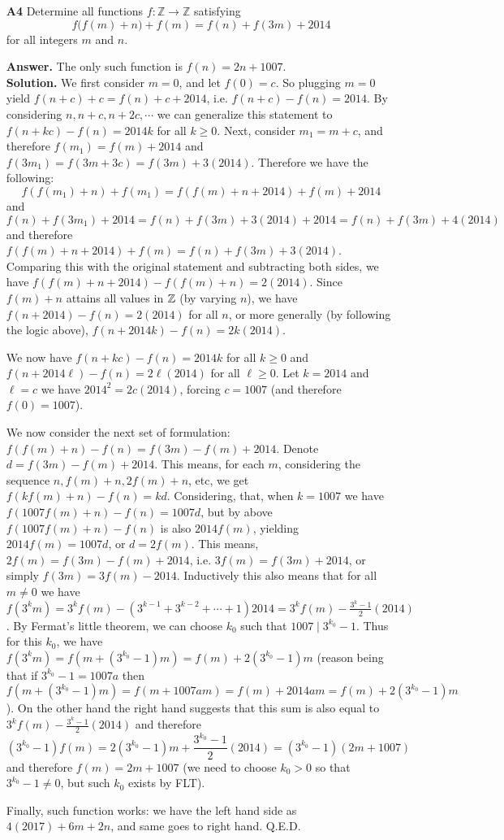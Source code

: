 \documentclass[11pt,a4paper]{article}
\begin{document}
\begin{enumerate}
	\item[\textbf{A4}] Determine all functions $f: \mathbb{Z}\to\mathbb{Z}$ satisfying \[f\big(f(m)+n\big)+f(m)=f(n)+f(3m)+2014\] for all integers $m$ and $n$.
	
	\textbf{Answer.} The only such function is $f(n)=2n+1007$. \\
	\textbf{Solution.} We first consider $m=0$, and let $f(0)=c$. So plugging $m=0$ yield $f(n+c)+c=f(n)+c+2014$, i.e. $f(n+c)-f(n)=2014$. By considering $n, n+c, n+2c, \cdots$ we can generalize this statement to $f(n+kc)-f(n)=2014k$ for all $k\ge 0$. 
	Next, consider $m_1=m+c$, and therefore $f(m_1)=f(m)+2014$ and $f(3m_1)=f(3m+3c)=f(3m)+3(2014)$. 
	Therefore we have the following: 
	\[f(f(m_1)+n)+f(m_1)=f(f(m)+n+2014)+f(m)+2014\]
	and
	\[
	f(n)+f(3m_1)+2014=f(n)+f(3m)+3(2014)+2014=f(n)+f(3m)+4(2014)
	\]
	and therefore $f(f(m)+n+2014)+f(m)=f(n)+f(3m)+3(2014)$. Comparing this with the original statement and subtracting both sides, we have $f(f(m)+n+2014)-f(f(m)+n)=2(2014)$. Since $f(m)+n$ attains all values in $\mathbb{Z}$ (by varying $n$), we have $f(n+2014)-f(n)=2(2014)$ for all $n$, or more generally (by following the logic above), $f(n+2014k)-f(n)=2k(2014)$. 
	
	We now have $f(n+kc)-f(n)=2014k$ for all $k\ge 0$ and $f(n+2014\ell)-f(n)=2\ell(2014)$ for all $\ell\ge 0$. Let $k=2014$ and $\ell=c$ we have $2014^2=2c(2014)$, forcing $c=1007$ (and therefore $f(0)=1007$). 
	
	We now consider the next set of formulation: $f(f(m)+n)-f(n)=f(3m)-f(m)+2014$. Denote $d=f(3m)-f(m)+2014$. 
	This means, for each $m$, considering the sequence $n, f(m)+n, 2f(m)+n$, etc, we get $f(kf(m)+n)-f(n)=kd$. Considering, that, when $k=1007$ we have $f(1007f(m)+n)-f(n)=1007d$, but by above $f(1007f(m)+n)-f(n)$ is also $2014f(m)$, yielding $2014f(m)=1007d$, or $d=2f(m)$. This means, $2f(m)=f(3m)-f(m)+2014$, i.e. $3f(m)=f(3m)+2014$, or simply $f(3m)=3f(m)-2014$. Inductively this also means that for all $m\neq 0$ we have $f(3^km)=3^kf(m)-(3^{k-1}+3^{k-2}+\cdots + 1)2014=3^kf(m)-\frac{3^k-1}{2}(2014)$. By Fermat's little theorem, we can choose $k_0$ such that $1007\mid 3^{k_0}-1$. 
	Thus for this $k_0$, we have $f(3^km)=f(m+(3^{k_0}-1)m)=f(m)+2(3^{k_0}-1)m$ (reason being that if $3^{k_0}-1=1007a$ then $f(m+(3^{k_0}-1)m)=f(m+1007am)=f(m)+2014am=f(m)+2(3^{k_0}-1)m$). 
	On the other hand the right hand suggests that this sum is also equal to $3^kf(m)-\frac{3^k-1}{2}(2014)$ and therefore
	\[(3^{k_0}-1)f(m)=2(3^{k_0}-1)m + \frac{3^{k_0}-1}{2}(2014) = (3^{k_0}-1)(2m + 1007)
	\]
	and therefore $f(m)=2m+1007$ (we need to choose $k_0>0$ so that $3^{k_0}-1\neq 0$, but such $k_0$ exists by FLT). 
	
	Finally, such function works: we have the left hand side as $4(2017)+6m+2n$, and same goes to right hand. Q.E.D. 
	
\end{enumerate}
\end{document}
